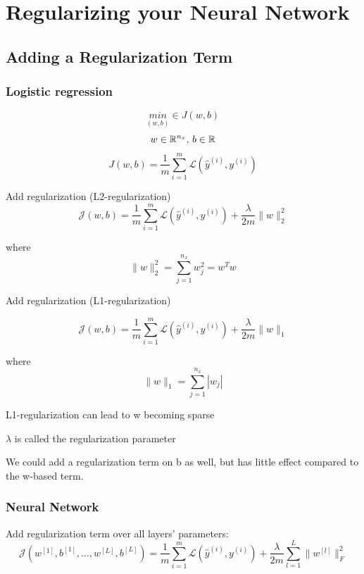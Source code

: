 \newpage






\section{Regularizing your Neural Network}

\subsection*{Adding a Regularization Term}

\subsubsection*{Logistic regression}

\[ \underset{(w, b)}{min} \in J(w, b) \]
\[ w\in\mathbb{R}^{n_x}$, $b\in\mathbb{R} \]
\[ J(w,b)=\frac{1}{m} \sum_{i=1}^{m}\mathcal{L}(\hat{y}^{(i)}, y^{(i)}) \]

Add regularization (L2-regularization)
\[ \mathcal{J}(w,b)=\frac{1}{m} \sum_{i=1}^{m}\mathcal{L}(\hat{y}^{(i)}, y^{(i)})+ \frac{\lambda}{2m} \|w\|_2^2 \]

where
\[ \|w\|_2^2=\sum_{j=1}^{n_x}w_j^2=w^Tw \]


Add regularization (L1-regularization)

\[ \mathcal{J}(w,b)=\frac{1}{m} \sum_{i=1}^{m}\mathcal{L}(\hat{y}^{(i)}, y^{(i)})+ \frac{\lambda}{2m} \|w\|_1 \]

where
\[ \|w\|_1 = \sum_{j=1}^{n_x}|w_j| \]

L1-regularization can lead to w becoming sparse

$\lambda$ is called the regularization parameter

We could add a regularization term on b as well, but has little effect compared to the w-based term.

\subsubsection*{Neural Network}

Add regularization term over all layers' parameters:
\[ 
    \mathcal{J}(w^{[1]}, b^{[1]}, \ldots, w^{[L]} , b^{[L]} )=\frac{1}{m} \sum_{i=1}^{m}\mathcal{L}(\hat{y}^{(i)}, y^{(i)})+ 
    \frac{\lambda}{2m}\sum_{l=1}^L\|w^{[l]}\|_F^2 
\]

